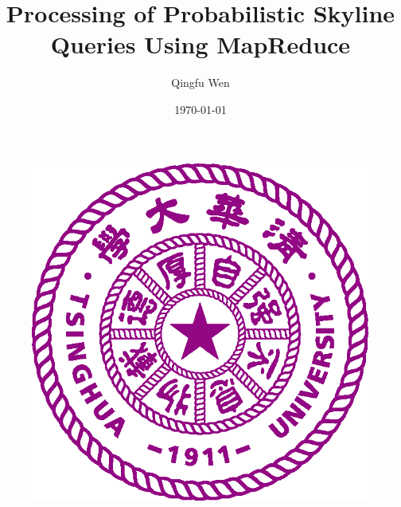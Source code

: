 \documentclass{beamer}
\title[Introduction to Modern Database Systems]{	Processing of Probabilistic Skyline Queries Using MapReduce} %
\author{Qingfu Wen} %
\institute[THU] %
{
School of Software, Tsinghua University\\ %
\medskip
\texttt{qingfu.wen@gmail.com} %
\\
\medskip
\text{Author: Yoonjae Park, Jun-Ki Min, Kyuseok Shim}
}
\date{\today} %
\begin{document}
\begin{frame}
\titlepage %
\begin{figure}[htpb]
  \begin{center}
	\includegraphics[width=0.18\linewidth]{Tsinghua_University_Logo.eps}
  \end{center}
\end{figure}
\end{frame}


\end{document}
